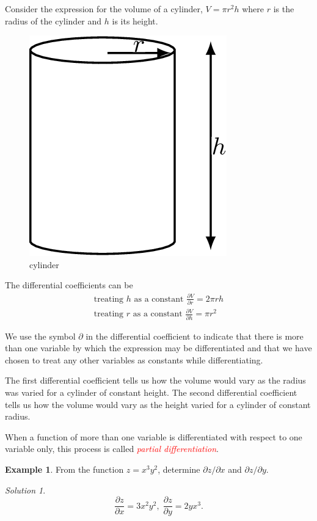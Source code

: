\documentclass[
  11pt,
  oneside]{book}
\newcommand{\slide}{}
\theoremstyle{definition}
\theoremstyle{definition}
\newtheorem{example}{Example}[chapter]
\theoremstyle{definition}
\theoremstyle{definition}
\theoremstyle{remark}
\newtheorem*{solution}{Solution}
\begin{document}
Consider the expression for the volume of a cylinder, \(V = \pi r^2h\) where \(r\) is the radius of the cylinder and \(h\) is its height.

\begin{figure}

{\centering \includegraphics[width=0.25\linewidth]{tikztopng-figure19} 

}

\caption{cylinder}\label{fig:unnamed-chunk-34}
\end{figure}

The differential coefficients can be
\begin{gather*}
\text{treating }h\text{ as a constant } \frac{\partial V}{\partial r} = 2\pi rh\\
\text{treating }r\text{ as a constant } \frac{\partial V}{\partial h} = \pi r^2
\end{gather*}
\slide

We use the symbol \(\partial\) in the differential coefficient to indicate that there is more than one variable by which the expression may be differentiated and that we have chosen to treat any other variables as constants while differentiating.

The first differential coefficient tells us how the volume would vary as the radius was varied for a cylinder of constant height. The second differential coefficient tells us how the volume would vary as the height varied for a cylinder of constant radius.

When a function of more than one variable is differentiated with respect to one variable only, this process is called \textcolor{red}{\em partial differentiation}.

\slide

\begin{example}
From the function \(z=x^3y^2\), determine \(\partial z/\partial x\) and \(\partial z/\partial y\).
\end{example}

\begin{solution}
\[
\frac{\partial z}{\partial x} = 3x^2y^2,\;\frac{\partial z}{\partial y} = 2yx^3.
\]
\end{solution}
\end{document}
